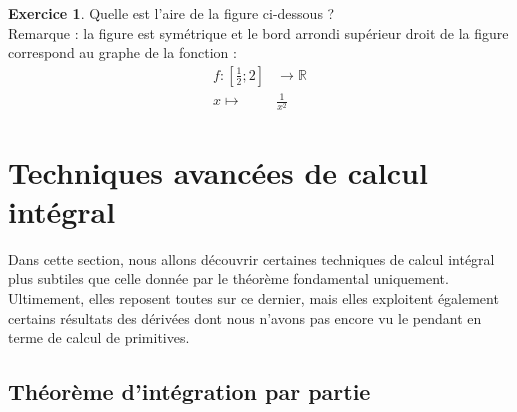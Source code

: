 \documentclass[a4paper,fontsize=13pt]{scrreprt}
\theoremstyle{plain}
\theoremstyle{definition}
\newtheorem{exo}[subsection]{Exercice}
\newcommand{\rr}{\mathbb{R}}
\newcommand {\grille}{\draw[help lines] (\xmin,\ymin) grid (\xmax,\ymax);}
\newcommand {\axes} {
	\draw[thick, ->] (\xmin,0) -- (\xmax+1,0);
	\draw[thick, ->] (0,\ymin) -- (0,\ymax+1);
	\draw (0,\ymax+0.5) node [left] {$y$};
	\draw (\xmax+0.5, 0) node [below] {$x$};
	\draw[thick] (-0.15,1)--(0.15,1) (1,-0.15)--(1,0.15);
	\draw (0,1)node[left]{$1$} (1,0)node[below]{$1$};
}
\begin{document}
\begin{exo}
Quelle est l'aire de la figure ci-dessous ? \\
Remarque : la figure est symétrique et le bord arrondi supérieur droit de la figure correspond au graphe de la fonction :
\begin{align*}
f : [\frac{1}{2};2] &\to \rr \\
x \mapsto& \frac{1}{x^2}
\end{align*}
\begin{center}
\end{center}
\end{exo}

\chapter{Techniques avancées de calcul intégral}

Dans cette section, nous allons découvrir certaines techniques de calcul intégral plus subtiles que celle donnée par le théorème fondamental uniquement. Ultimement, elles reposent toutes sur ce dernier, mais elles exploitent également certains résultats des dérivées dont nous n'avons pas encore vu le pendant en terme de calcul de primitives.

\section{Théorème d'intégration par partie}
\end{document}

